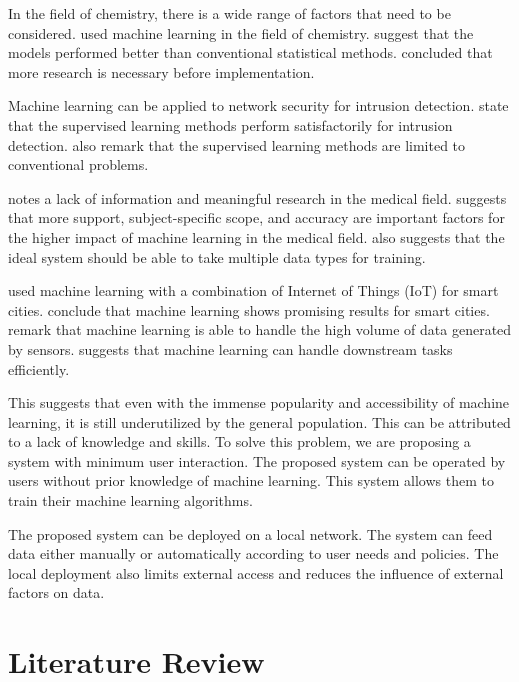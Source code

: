 \documentclass[a4paper,fleqn]{cas-dc}
\begin{document}
In the field of chemistry, there is a wide range of factors that need to be considered. \cite*{ref_paper_10} used machine learning in the field of chemistry. \citeauthor{ref_paper_10} suggest that the models performed better than conventional statistical methods. \citeauthor{ref_paper_10} concluded that more research is necessary before implementation.

Machine learning can be applied to network security for intrusion detection. \cite*{ref_paper_21} state that the supervised learning methods perform satisfactorily for intrusion detection. \citeauthor{ref_paper_21} also remark that the supervised learning methods are limited to conventional problems.

\cite*{ref_paper_24} notes a lack of information and meaningful research in the medical field. \citeauthor{ref_paper_24} suggests that more support, subject-specific scope, and accuracy are important factors for the higher impact of machine learning in the medical field. \citeauthor{ref_paper_24} also suggests that the ideal system should be able to take multiple data types for training.

\cite*{ref_paper_29} used machine learning with a combination of Internet of Things (IoT) for smart cities. \citeauthor{ref_paper_29} conclude that machine learning shows promising results for smart cities. \citeauthor{ref_paper_29} remark that machine learning is able to handle the high volume of data generated by sensors. \cite*{ref_paper_12} suggests that machine learning can handle downstream tasks efficiently.

This suggests that even with the immense popularity and accessibility of machine learning, it is still underutilized by the general population. This can be attributed to a lack of knowledge and skills. To solve this problem, we are proposing a system with minimum user interaction. The proposed system can be operated by users without prior knowledge of machine learning. This system allows them to train their machine learning algorithms.

The proposed system can be deployed on a local network. The system can feed data either manually or automatically according to user needs and policies. The local deployment also limits external access and reduces the influence of external factors on data.

\section{Literature Review}\label{sec:literature_review}
\end{document}
